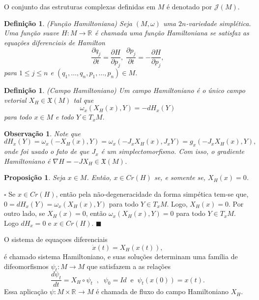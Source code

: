 \documentclass[12pt]{book}
\newtheorem{definicao}[teorema]{Definição}
\newtheorem{observacao}[teorema]{Observação}
\newtheorem{proposicao}[teorema]{Proposição}
\newenvironment{prova}[1]{$\square$ #1}{\hfill$\blacksquare$}
\newcommand{\campohamiltoniano}[1]{X_{H}(#1)}
\newcommand{\campohamiltonianoabrev}{X_{H}}
\newcommand{\campossuaves}[1]{\mathfrak{X}(#1)}
\newcommand{\derivada}[2]{\frac{d #1}{d #2}}
\newcommand{\espacotangenteponto}[2]{T_{#1}#2}
\newcommand{\estruturascomplexasM}{\mathcal{J}(M)}
\newcommand{\pontoscriticos}[1]{\textit{Cr}(#1)}
\newcommand{\real}[1]{\mathbb{R}^{#1}}
\newcommand{\reta}{\real{}}
\begin{document}
	O conjunto das estruturas complexas definidas em $M$ é denotado por $\estruturascomplexasM$.

	\begin{definicao}
		(Função Hamiltoniana) Seja $(M, \omega)$ uma $2n$-variedade simplética. Uma função suave $H : M \to \real{}$ é chamada uma função Hamiltoniana se satisfaz as equações diferenciais de Hamilton
		$$
		\frac{\partial q_{j}}{\partial t} = \frac{\partial H}{\partial p_{j}}, \; \frac{\partial p_{j}}{\partial t} = -\frac{\partial H}{\partial p_{j}},
		$$
		para $1\leq j \leq n$ e $(q_{1}, \dots, q_{n}, p_{1}, \dots, p_{n}) \in M$.
	\end{definicao}
	
	\begin{definicao}
		(Campo Hamiltoniano) Um campo Hamiltoniano é o único campo vetorial $X_{H}\in \campossuaves{M}$ tal que
		$$
		\omega_{x}(X_{H}(x), Y) = -dH_{x}(Y)
		$$
		para todo $x\in M$ e todo $Y \in \espacotangenteponto{x}{M}$.
	\end{definicao}
	
	\begin{observacao}
		Note que 
		$$
		dH_{x}(Y)=\omega_{x}(-X_{H}(x), Y) =\omega_{x}(-J_{x}X_{H}(x), J_{x}Y) =g_{x}(-J_{x}X_{H}(x), Y),$$
		onde foi usado o fato de que $J_{x}$ é um simplectomorfismo. Com isso, o gradiente Hamiltoniano é $\nabla H = -JX_{H} \in \campossuaves{M}$.
	\end{observacao}
	
	\begin{proposicao}
		Seja $x\in M$. Então, $x\in \pontoscriticos{H}$ se, e somente se, $\campohamiltoniano{x}=0$.
	\end{proposicao}
	\begin{prova}
		Se $x\in \pontoscriticos{H}$, então pela não-degeneracidade da forma simpética tem-se que, $0=dH_{x}(Y)=\omega_{x}(\campohamiltonianoabrev(x), Y)$ para todo $Y\in T_{x}M$. Logo, $\campohamiltoniano{x} =0$. Por outro lado, se $\campohamiltoniano{x} =0$, então $\omega_{x}(\campohamiltonianoabrev(x), Y)=0$ para todo $Y\in T_{x}M$. Logo $dH_{x}=0$ e $x\in \pontoscriticos{H}$.
	\end{prova}
	
	O sistema de equaçoes diferenciais
	$$
		\dot{x}(t)=\campohamiltoniano{x(t)},
	$$
	é chamado sistema Hamiltoniano, e suas soluções determinam uma família de difeomorfismos $\psi_{t}:M\to M$ que satisfazem a as relações 
	$$
	\derivada{\psi_{t}}{t}=\campohamiltonianoabrev\circ\psi_{t} \;\;, \;\; \psi_{0}=Id \;\;\text{e}\;\;  \psi_{t}(x(0)) = x(t).
	$$
	Essa aplicação $\psi: M\times \reta \to M$ é chamada de fluxo do campo Hamiltoniano $\campohamiltonianoabrev$.
	
\end{document}

